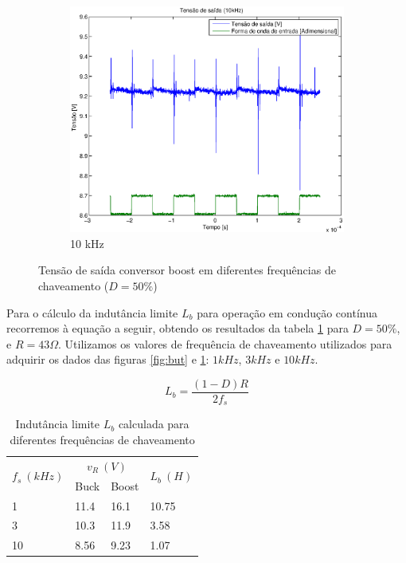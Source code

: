 \documentclass{article}
\begin{document}
\begin{figure}[H]
\begin{subfigure}[b]{0.3\textwidth}
		\includegraphics[width=\textwidth]{Dados/boost/t10k}
		\caption{10 kHz}
	\end{subfigure}
	\caption{Tensão de saída conversor boost em diferentes frequências de chaveamento ($D=50\%$)}
	\label{fig:bot}
\end{figure}

Para o cálculo da indutância limite $L_b$ para operação em condução contínua recorremos à equação a seguir, obtendo os resultados da tabela \ref{tab:Lb} para $D=50\%$, e $R=43\Omega$. Utilizamos os valores de frequência de chaveamento utilizados para adquirir os dados das figuras \ref{fig:but} e \ref{fig:bot}: $1kHz$, $3kHz$ e $10kHz$.

\begin{equation}
L_b = \frac{(1-D)R}{2f_s}	
\end{equation}

\begin{table}[H]
	\centering
	\caption{Indutância limite $L_b$ calculada para diferentes frequências de chaveamento}
	\label{tab:Lb}
	\begin{tabular}{|l|l|l|l|}
		\hline
		\multicolumn{1}{|c|}{\multirow{2}{*}{$f_s\ (kHz)$}} & 
		\multicolumn{2}{c|}{$v_R\ (V)$} & 
		\multicolumn{1}{c|}{\multirow{2}{*}{$L_b\ (H)$}} \\ \cline{2-3}
		\multicolumn{1}{|c|}{} 	& Buck           & Boost          & 
		\multicolumn{1}{c|}{}                          					  \\ \hline
		1     					& 11.4           & 16.1           & 10.75 \\ \hline
		3     					& 10.3           & 11.9           & 3.58  \\ \hline
		10    					& 8.56           & 9.23           & 1.07  \\ \hline
	\end{tabular}
\end{table}	
\end{document}
